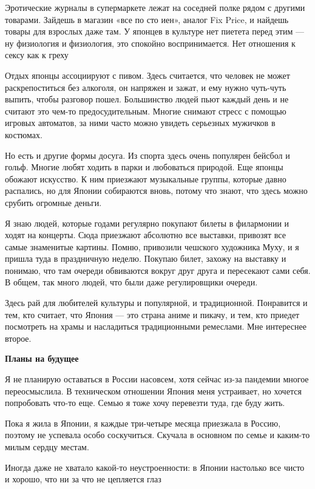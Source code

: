 \begin{fancyquotes}
    Эротические журналы в супермаркете лежат на соседней полке рядом с другими товарами. Зайдешь в магазин «все по сто иен», аналог Fix Price, и найдешь товары для взрослых даже там. У японцев в культуре нет пиетета перед этим — ну физиология и физиология, это спокойно воспринимается. Нет отношения к сексу как к греху
\end{fancyquotes}

Отдых японцы ассоциируют с пивом. Здесь считается, что человек не может раскрепоститься без алкоголя, он напряжен и зажат, и ему нужно чуть-чуть выпить, чтобы разговор пошел. Большинство людей пьют каждый день и не считают это чем-то предосудительным. Многие снимают стресс с помощью игровых автоматов, за ними часто можно увидеть серьезных мужичков в костюмах.

Но есть и другие формы досуга. Из спорта здесь очень популярен бейсбол и гольф. Многие любят ходить в парки и любоваться природой. Еще японцы обожают искусство. К ним приезжают музыкальные группы, которые давно распались, но для Японии собираются вновь, потому что знают, что здесь можно срубить огромные деньги.

Я знаю людей, которые годами регулярно покупают билеты в филармонии и ходят на концерты. Сюда приезжают абсолютно все выставки, привозят все самые знаменитые картины. Помню, привозили чешского художника Муху, и я пришла туда в праздничную неделю. Покупаю билет, захожу на выставку и понимаю, что там очереди обвиваются вокруг друг друга и пересекают сами себя. В общем, так много людей, что были даже регулировщики очереди.

Здесь рай для любителей культуры и популярной, и традиционной. Понравится и тем, кто считает, что Япония — это страна аниме и пикачу, и тем, кто приедет посмотреть на храмы и насладиться традиционными ремеслами. Мне интереснее второе.

\textbf{Планы на будущее}

Я не планирую оставаться в России насовсем, хотя сейчас из-за пандемии многое переосмыслила. В техническом отношении Япония меня устраивает, но хочется попробовать что-то еще. Семью я тоже хочу перевезти туда, где буду жить.

Пока я жила в Японии, я каждые три-четыре месяца приезжала в Россию, поэтому не успевала особо соскучиться. Скучала в основном по семье и каким-то милым сердцу местам.

\begin{fancyquotes}
    Иногда даже не хватало какой-то неустроенности: в Японии настолько все чисто и хорошо, что ни за что не цепляется глаз
\end{fancyquotes}

